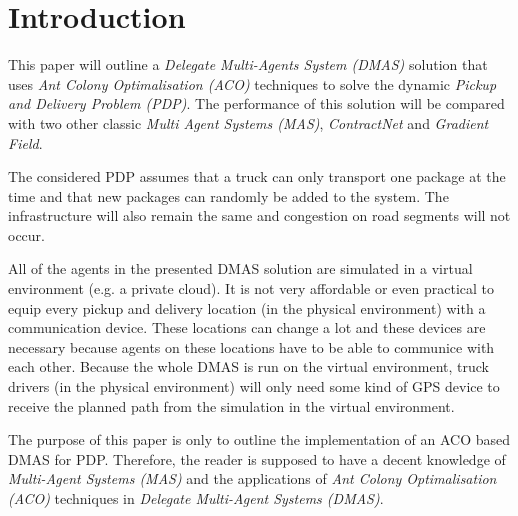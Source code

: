 \section{Introduction}
\label{sec:intro}


\npar This paper will outline a \textit{Delegate Multi-Agents System (DMAS)}
solution that uses \textit{Ant Colony Optimalisation (ACO)} techniques to solve
the dynamic \textit{Pickup and Delivery Problem (PDP)}. The performance of this
solution will be compared with two other classic \textit{Multi Agent Systems
(MAS)}, \textit{ContractNet} and \textit{Gradient Field}.

\npar The considered PDP assumes that a truck can only transport one package at
the time and that new packages can randomly be added to the system. The
infrastructure will also remain the same and congestion on road segments will
not occur.

\npar All of the agents in the presented DMAS solution are simulated in a virtual environment (e.g. a private cloud). It is not very affordable or even practical to equip every
pickup and delivery location (in the physical environment) with a communication device. These locations can change a lot and these devices are necessary because agents on these locations have to be able to communice with each other.
Because the whole DMAS is run on the virtual environment, truck drivers (in the physical environment) will only need some kind of GPS device to receive the planned path from the simulation in the virtual environment.

\npar The purpose of this paper is only to outline the implementation of an ACO based DMAS for PDP. Therefore, the reader is supposed to have a decent knowledge of \textit{Multi-Agent
Systems (MAS)} and the applications of \textit{Ant Colony Optimalisation (ACO)}
techniques in \textit{Delegate Multi-Agent Systems (DMAS)}.

